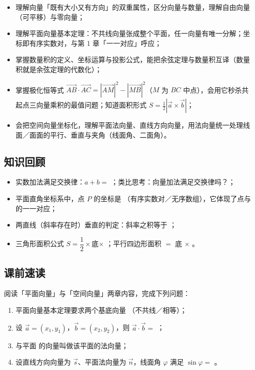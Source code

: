 \begin{learnobjective}
\begin{itemize}
  \item 理解向量「既有大小又有方向」的双重属性，区分向量与数量，理解自由向量（可平移）与零向量；
  \item 理解平面向量基本定理：不共线向量张成整个平面，任一向量有唯一分解；坐标即有序实数对，与第 1 章「一一对应」呼应；
  \item 掌握数量积的定义、坐标运算与投影公式，能把余弦定理与数量积互译（数量积就是余弦定理的代数化）；
  \item 掌握极化恒等式 $\overrightarrow{AB}\cdot\overrightarrow{AC}=|\overrightarrow{AM}|^2-|\overrightarrow{MB}|^2$（$M$ 为 $BC$ 中点），会用它秒杀共起点三向量乘积的最值问题；知道面积形式 $S=\frac12|\vec a\times\vec b|$；
  \item 会把空间向量坐标化，理解平面法向量、直线方向向量，用法向量统一处理线面／面面的平行、垂直与夹角（线面角、二面角）。
\end{itemize}
\end{learnobjective}

\begin{preview}
\subsection*{知识回顾}
\begin{itemize}
  \item 实数加法满足交换律：$a+b=$ \blank；类比思考：向量加法满足交换律吗？\blank；
  \item 平面直角坐标系中，点 $P$ 的坐标是 \blank（有序实数对／无序数组），它体现了点与 \blank 的一一对应；
  \item 两直线（斜率存在时）垂直的判定：斜率之积等于 \blank；
  \item 三角形面积公式 $S=\dfrac12\times$底$\times$ \blank；平行四边形面积 $=$ 底 $\times$ \blank。
\end{itemize}

\subsection*{课前速读}
阅读「平面向量」与「空间向量」两章内容，完成下列问题：
\begin{enumerate}
  \item 平面向量基本定理要求两个基底向量 \blank（不共线／相等）；
  \item 设 $\vec a=(x_1,y_1)$，$\vec b=(x_2,y_2)$，则 $\vec a\cdot\vec b=$ \blank；
  \item 与平面 \blank 的向量叫做该平面的法向量；
  \item 设直线方向向量为 $\vec s$、平面法向量为 $\vec n$，线面角 $\varphi$ 满足 $\sin\varphi=$ \blank。
\end{enumerate}
\end{preview}


